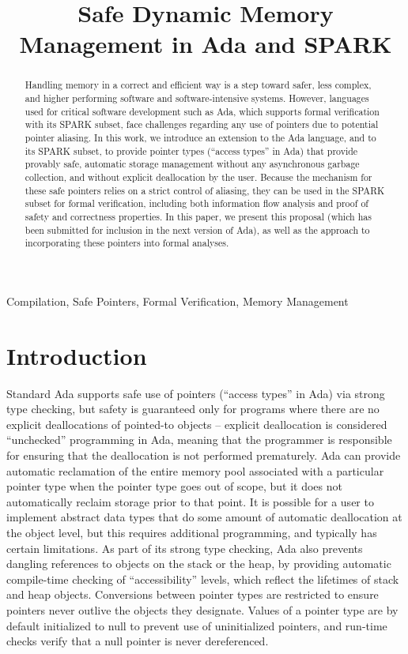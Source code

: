 \documentclass{llncs}
\begin{document}
\title{Safe Dynamic Memory Management in Ada and SPARK}

\maketitle
\begin{abstract}
Handling memory in a correct and efficient way is a step toward safer, less complex, and higher performing software and software-intensive systems. However, languages used for critical software development such as Ada, which supports formal verification with its SPARK subset, face challenges regarding any use of pointers due to potential pointer aliasing. In this work, we introduce an extension to the Ada language, and to its SPARK subset, to provide pointer types (``access types'' in Ada) that provide provably safe, automatic storage management without any asynchronous garbage collection, and without explicit deallocation by the user. Because the mechanism for these safe pointers relies on a strict control of aliasing, they can be used in the SPARK subset for formal verification, including both information flow analysis and proof of safety and correctness properties. In this paper, we present this proposal (which has been submitted for inclusion in the next version of Ada), as well as the approach to incorporating these pointers into formal analyses.
\end{abstract}



\keywords 

Compilation, Safe Pointers, Formal Verification, Memory Management


\section{Introduction}

Standard Ada supports safe use of pointers (``access types'' in Ada) via strong type checking, but safety is guaranteed only for programs where there are no explicit deallocations of pointed-to objects -- explicit deallocation is considered ``unchecked'' programming in Ada, meaning that the programmer is responsible for ensuring that the deallocation is not performed prematurely. Ada can provide automatic reclamation of the entire memory pool associated with a particular pointer type when the pointer type goes out of scope, but it does not automatically reclaim storage prior to that point. It is possible for a user to implement abstract data types that do some amount of automatic deallocation at the object level, but this requires additional programming, and typically has certain limitations. As part of its strong type checking, Ada also prevents dangling references to objects on the stack or the heap, by providing automatic compile-time checking of ``accessibility'' levels, which reflect the lifetimes of stack and heap objects.  Conversions between pointer types are restricted to ensure pointers never outlive the objects they designate. Values of a pointer type are by default initialized to null to prevent use of uninitialized pointers, and run-time checks verify that a null pointer is never dereferenced.
\end{document}
